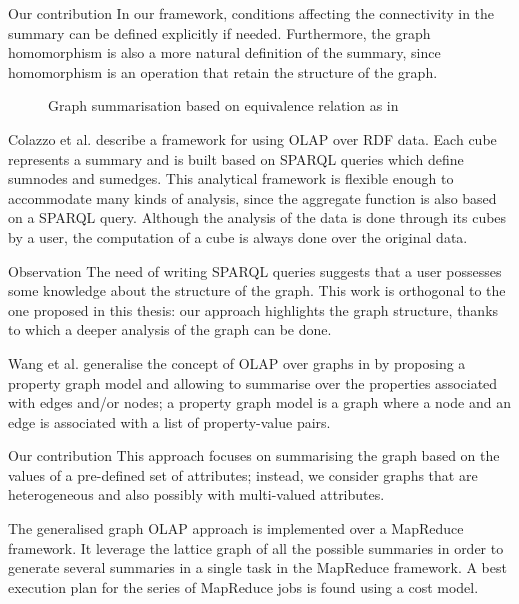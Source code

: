 \begin{centeremph}{Our contribution}
	In our framework, conditions affecting the connectivity in the summary can be defined explicitly if needed. Furthermore, the graph homomorphism is also a more natural definition of the summary, since homomorphism is an operation that retain the structure of the graph.
\end{centeremph}

\begin{figure}
	\centering
	\resizebox{.5\textwidth}{!}{
		
	}
	\caption{Graph summarisation based on equivalence relation as in \cite{zhao:sigmod:2011}}
	\label{fig:graph-cube}
\end{figure}

Colazzo et al. \cite{colazzo:www:2014} describe a framework for using OLAP over RDF data. Each cube represents a summary and is built based on SPARQL queries which define sumnodes and sumedges. This analytical framework is flexible enough to accommodate many kinds of analysis, since the aggregate function is also based on a SPARQL query. Although the analysis of the data is done through its cubes by a user, the computation of a cube is always done over the original data.

\begin{centeremph}{Observation}
 	The need of writing SPARQL queries suggests that a user possesses some knowledge about the structure of the graph. This work is orthogonal to the one proposed in this thesis: our approach highlights the graph structure, thanks to which a deeper analysis of the graph can be done.
\end{centeremph}

Wang et al. generalise the concept of OLAP over graphs in \cite{zhengkui:2014:ppg} by proposing a property graph model and allowing to summarise over the properties associated with edges and/or nodes; a property graph model is a graph where a node and an edge is associated with a list of property-value pairs.

\begin{centeremph}{Our contribution}
	This approach focuses on summarising the graph based on the values of a pre-defined set of attributes; instead, we consider graphs that are heterogeneous and also possibly with multi-valued attributes.%
\end{centeremph}

The generalised graph OLAP approach \cite{zhengkui:2014:ppg} is implemented over a MapReduce \cite{dean:2008:msd} framework. It leverage the lattice graph of all the possible summaries in order to generate several summaries in a single task in the MapReduce framework. A best execution plan for the series of MapReduce jobs is found using a cost model.


